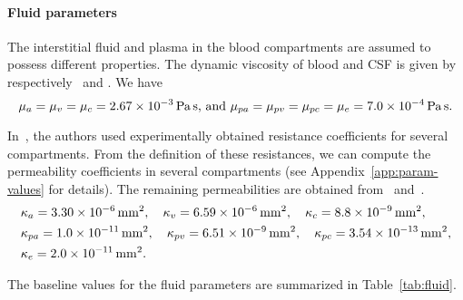 \documentclass[a4paper,11pt]{article}
\newcommand{\1}{^{(1)}}
\newcommand{\2}{^{(2)}}
\begin{document}
\paragraph{Fluid parameters}

The interstitial fluid and plasma in the blood compartments are assumed to possess different properties. 
The dynamic viscosity of blood and CSF is given by respectively~\cite{Guo-2019-MPET} and \cite{bloomfield1998effects}. We have 
\[
    \mu_a = \mu_v = \mu_c = 2.67 \times 10^{-3} \, \text{\si{\pascal \second}, and }  \mu_{pa} = \mu_{pv} = \mu_{pc}  = \mu_e = 7.0 \times 10^{-4}\, \text{\si{\pascal \second}}.
\]


In~\cite{Vinje-2020-ICP}, the authors used experimentally obtained resistance coefficients for several compartments. From the definition of these resistances, we can compute the permeability coefficients in several compartments (see Appendix~\ref{app:param-values} for details). The remaining permeabilities are obtained from~\cite{el2015multi} and~\cite{jozsa2021porous}. 
\[
\begin{aligned}
    &\kappa_{a} = 3.30 \times 10^{-6} \, \text{\si{mm^2}},\quad \kappa_v = 6.59\times 10^{-6} \, \text{\si{mm^2}},\quad \kappa_{c}  = 8.8\times 10^{-9} \, \text{\si{mm^2}},\\
    &\kappa_{pa} =  1.0\times 10^{-11}\, \text{\si{mm^2}},\quad \kappa_{pv} = 6.51\times 10^{-9}\, \text{\si{mm^2}},\quad \kappa_{pc}  = 3.54 \times 10^{-13}\,\text{\si{mm^2}}, \\
    &\kappa_e = 2.0\times 10^{-11} \, \text{\si{mm^2}}.
    \end{aligned}
\]

The baseline values for the fluid parameters are summarized in Table~\ref{tab:fluid}.
\end{document}
